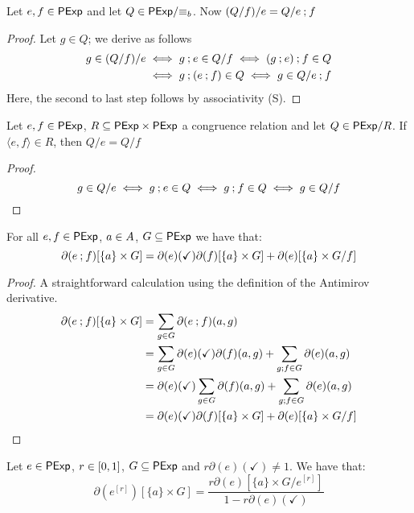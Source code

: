 \begin{lemma}\label{apx:lem:associativity_of_cutting}
    Let \(e,f \in \mathsf{PExp}\) and let \(Q \in \mathsf{PExp} / {\equiv_b}\).
    Now \((Q/{f})/{e} = Q / {e}\mathbin{;}{f}\)
\end{lemma}
\begin{proof}
    Let \({g} \in Q\); we derive as follows
    \begin{align*}
        {g} \in (Q/ {f})/{e}
            &\iff {g} \mathbin{;} {e} \in Q/{f}
            \iff ({g} \mathbin{;} {e}) \mathbin{;}{{f}} \in Q\\
            &\iff {g} \mathbin{;} ({e} \mathbin{;} {f}) \in Q
            \iff {g} \in Q / {{e} \mathbin{;} {f}}
    \end{align*}
    Here, the second to last step follows by associativity (\textsf{S}).
\end{proof}
\begin{lemma}\label{apx:lem:swapping_ends}
Let $e,f \in \mathsf{PExp}$, $R \subseteq {\mathsf{PExp}\times \mathsf{PExp}}$ a congruence relation and let $Q \in {\mathsf{PExp}}/{R}$. If $\langle e , f \rangle \in R$, then  $Q/e = Q/f$
\end{lemma}
\begin{proof}
    $$
    {g} \in Q / {e} \iff g \mathbin{;} e \in Q \iff g \mathbin{;} f \in Q \iff g \in Q/f \qedhere
    $$
\end{proof}
\begin{lemma}\label{apx:lem:simpler_sequencing_semantics}
    For all $e,f \in \mathsf{PExp}$, $a \in {A}$, $G \subseteq \mathsf{PExp}$ we have that:
    $$
    \partial(e \mathbin{;} f)[\{a\} \times G] = \partial(e)(\checkmark)\partial(f)[\{a\} \times G] + \partial(e)[\{a\} \times {G}/{f}]
    $$
\end{lemma}
\begin{proof}
    A straightforward calculation using the definition of the Antimirov derivative.
    \begin{align*}
        \partial(e \mathbin{;} f)[\{a\} \times G] &= \sum_{g \in G} \partial(e \mathbin{;} f)(a,g) \\
        &=\sum_{g \in G} \partial(e)(\checkmark)\partial(f)(a,g) + \sum_{g \mathbin{;} f \in G} \partial(e)(a,g) \\
        &=\partial(e)(\checkmark)\sum_{g \in G}\partial(f)(a,g) + \sum_{g \mathbin{;} f \in G} \partial(e)(a,g) \\
        &=\partial(e)(\checkmark)\partial(f)[\{a\} \times G] + \partial(e)[\{a\} \times {G}/{f}] \qedhere
    \end{align*}
\end{proof}
\begin{lemma}\label{apx:lem:simpler_loop_semantics}
    Let $e \in \mathsf{PExp}$, $r \in \interval{0}{1}$, $G \subseteq \mathsf{PExp}$ and $r\partial(e)(\checkmark) \neq 1$. We have that:
    $$
    \partial\left(e^{[r]}\right)[\{a\} \times G] =\frac{r\partial(e)[\{a\} \times {G}/{e^{[r]}}]}{1-r\partial(e)(\checkmark)}
    $$
\end{lemma}

